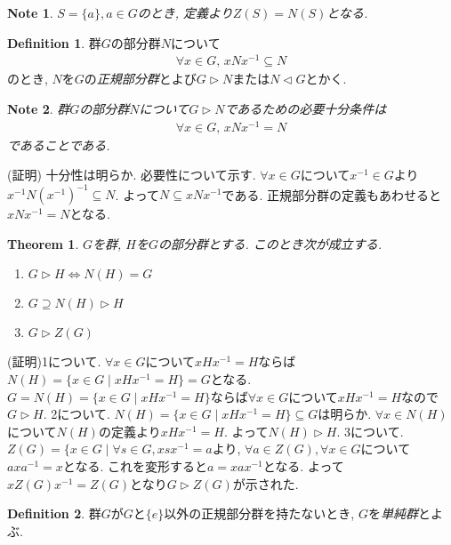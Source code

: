 \documentclass{article}
\theoremstyle{plain}
\newtheorem{theorem}{Theorem}
\theoremstyle{definition}
\newtheorem{definition}{Definition}
\theoremstyle{plain}
\newtheorem{note}{Note}
\numberwithin{equation}{section}
\numberwithin{theorem}{section}
\numberwithin{definition}{section}
\numberwithin{note}{section}
\begin{document}
\begin{note}
     $S=\lbrace a\rbrace,  a \in G$のとき, 定義より$Z(S)=N(S)$となる.
\end{note}
\begin{definition}
     群$G$の部分群$N$について
     \begin{align}
          \forall x \in G,\, xNx^{-1}\subseteq N
     \end{align}
     のとき, $N$を$G$の\emph{正規部分群}とよび$G\rhd N$または$N \lhd G$とかく.
\end{definition}
\begin{note}
     群$G$の部分群$N$について$G\rhd N$であるための必要十分条件は
     \begin{align}
          \forall x \in G,\, xNx^{-1}=N
     \end{align}
     であることである.
\end{note}
(証明) 十分性は明らか. 必要性について示す.
$\forall x \in G$について$x^{-1}\in G$より$x^{-1}N(x^{-1})^{-1}\subseteq N$. よって$N\subseteq xNx^{-1}$である. 正規部分群の定義もあわせると$xNx^{-1}=N$となる.
\begin{theorem}
     $G$を群, $H$を$G$の部分群とする. このとき次が成立する.
     \begin{enumerate}
          \item $G\rhd H\iff N(H)=G$
          \item $G\supseteq N(H)\rhd H$
          \item $G\rhd Z(G)$
     \end{enumerate}
\end{theorem}
(証明)1について. $\forall x \in G$について$xHx^{-1}=H$ならば$N(H)=\lbrace x\in G\mid xHx^{-1}=H\rbrace=G$となる. $G=N(H)=\lbrace x\in G\mid xHx^{-1}=H\rbrace$ならば$\forall x\in G$について$xHx^{-1}=H$なので$G\rhd H$.
2について. $N(H)=\lbrace x\in G\mid xHx^{-1}=H\rbrace \subseteq G$は明らか. $\forall x \in N(H)$について$N(H)$の定義より$xHx^{-1}=H$. よって$N(H)\rhd H$.
3について. $Z(G)=\lbrace x\in G\mid \forall s\in G, xsx^{-1}=a$より, $\forall a\in Z(G),\forall x \in G$について$axa^{-1}=x$となる. これを変形すると$a=xax^{-1}$となる. よって$xZ(G)x^{-1}=Z(G)$となり$G\rhd Z(G)$が示された.
\begin{definition}
     群$G$が$G$と$\lbrace e\rbrace$以外の正規部分群を持たないとき, $G$を\emph{単純群}とよぶ.
\end{definition}
\end{document}
